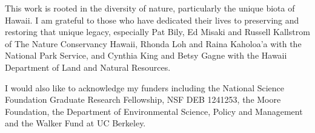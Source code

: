 \documentclass{ucbthesis}
\begin{document}
\begin{frontmatter}
\begin{acknowledgements}
This work is rooted in the diversity of nature, particularly the
unique biota of Hawaii.  I am grateful to those who have dedicated
their lives to preserving and restoring that unique legacy, especially
Pat Bily, Ed Misaki and Russell Kallstrom of The Nature Conservancy
Hawaii, Rhonda Loh and Raina Kaholoa'a with the National Park Service,
and Cynthia King and Betsy Gagne with the Hawaii Department of Land
and Natural Resources.

I would also like to acknowledge my funders including the National
Science Foundation Graduate Research Fellowship, NSF DEB 1241253, the
Moore Foundation, the Department of Environmental Science, Policy
and Management and the Walker Fund at UC Berkeley.
\end{acknowledgements}

\end{frontmatter}


\pagestyle{simple}
\nobibintoc

\let\origChapName\chaptername
\renewcommand{\chaptername}{}

\renewcommand{\chaptername}{\origChapName}



\renewcommand{\chaptername}{}


\appendix


\end{document}
